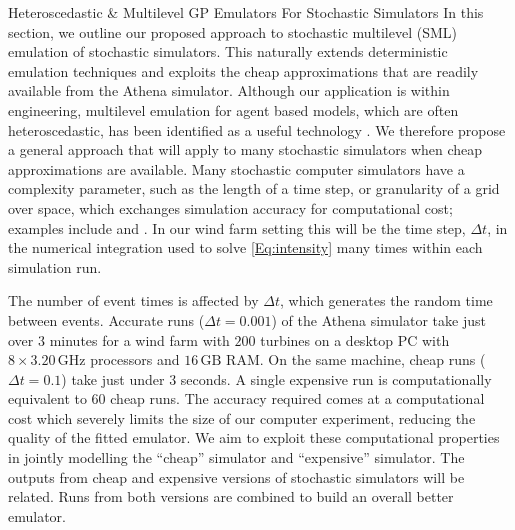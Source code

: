\begin{chapter}{Heteroscedastic \& Multilevel GP Emulators For Stochastic Simulators\label{Ch:Hetsml}}
In this section, we outline our proposed approach to stochastic multilevel (SML) emulation of stochastic simulators. This naturally extends deterministic emulation techniques and exploits the cheap approximations that are readily available from the Athena simulator. Although our application is within engineering, multilevel emulation for agent based models, which are often heteroscedastic, has been identified as a useful technology \citep{Swallow2022}. We therefore propose a general approach that will apply to many stochastic simulators when cheap approximations are available. Many stochastic computer simulators have a complexity parameter, such as the length of a time step, or granularity of a grid over space, which exchanges simulation accuracy for computational cost; examples include \cite{Kennedy2000} and \citet{Le2014}. In our wind farm setting this will be the time step, $\Delta t$, in the numerical integration used to solve \cref{Eq:intensity} many times within each simulation run.

 The number of event times is affected by $\Delta t$, which generates the random time between events. Accurate runs ($\Delta t = 0.001$) of the Athena simulator take just over $3$ minutes for a wind farm with $200$ turbines on a desktop PC with $8 \times 3.20 \,\text{GHz}$ processors and $16\,\text{GB}$ RAM. On the same machine, cheap runs ($\Delta t = 0.1$) take just under $3$ seconds. A single expensive run is computationally equivalent to $60$ cheap runs. The accuracy required comes at a computational cost which severely limits the size of our computer experiment, reducing the quality of the fitted emulator. We aim to exploit these computational properties in jointly modelling the ``cheap'' simulator and ``expensive'' simulator. The outputs from cheap and expensive versions of stochastic simulators will be related. Runs from both versions are combined to build an overall better emulator.


\end{chapter}
